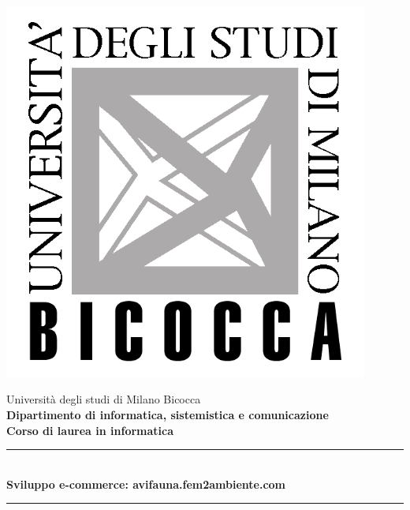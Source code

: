 
\begin{titlepage}

\begin{minipage}[c][0cm][t]{0.30\linewidth}
	\includegraphics[width=0.9\textwidth]{./images/logo-bicocca.jpg}
\end{minipage}

\hfill
\begin{minipage}[c][6cm][t]{0.67\linewidth}
	\vspace*{1cm}
	\begin{center}
		{\Large Università degli studi di Milano Bicocca} \\[0.5cm]
		{\Large \bfseries Dipartimento di informatica, sistemistica e comunicazione} \\[0.5cm]
		{\Large \bfseries Corso di laurea in informatica}
	\end{center}
\end{minipage}

\begin{center}
	\vspace*{3cm}
	\rule{\linewidth}{0.5mm} \\[0.4cm]
	{ \huge \bfseries Sviluppo e-commerce: avifauna.fem2ambiente.com} \\[0.1cm]
	\rule{\linewidth}{0.5mm} \\[1.5cm]
\end{center}


\end{titlepage}
